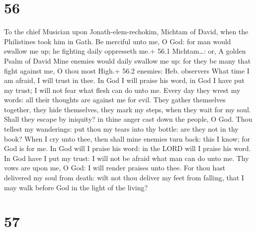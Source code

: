 \hypertarget{section-55}{%
\section{56}\label{section-55}}

To the chief Musician upon Jonath-elem-rechokim, Michtam of David, when
the Philistines took him in Gath.  Be merciful unto me, O
God: for man would swallow me up; he fighting daily oppresseth me.+ 56.1
Michtam\ldots: or, A golden Psalm of David  Mine enemies
would daily swallow me up: for they be many that fight against me, O
thou most High.+ 56.2 enemies: Heb. observers  What time I
am afraid, I will trust in thee.  In God I will praise his
word, in God I have put my trust; I will not fear what flesh can do unto
me.  Every day they wrest my words: all their thoughts are
against me for evil.  They gather themselves together, they
hide themselves, they mark my steps, when they wait for my soul.
 Shall they escape by iniquity? in thine anger cast down the
people, O God.  Thou tellest my wanderings: put thou my
tears into thy bottle: are they not in thy book?  When I cry
unto thee, then shall mine enemies turn back: this I know; for God is
for me.  In God will I praise his word: in the LORD will I
praise his word.  In God have I put my trust: I will not be
afraid what man can do unto me.  Thy vows are upon me, O
God: I will render praises unto thee.  For thou hast
delivered my soul from death: wilt not thou deliver my feet from
falling, that I may walk before God in the light of the living?

\hypertarget{section-56}{%
\section{57}\label{section-56}}


